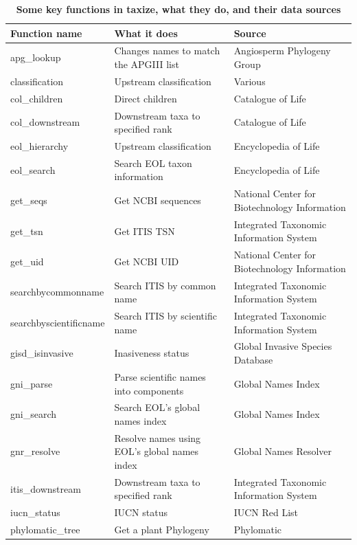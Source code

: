 \documentclass[10pt]{article}\usepackage[]{graphicx}\usepackage[]{color}
\begin{document}
\begin{table}[!ht]
\caption{
\bf{Some key functions in taxize, what they do, and their data sources}}
\begin{tabular}{|l|L|L|}
\hline
Function name & What it does & Source \\
\hline
apg\_lookup & Changes names to match the APGIII list & Angiosperm Phylogeny Group \cite{apgiii}  \\
classification & Upstream classification & Various  \\
col\_children & Direct children & Catalogue of Life \cite{col}  \\
col\_downstream & Downstream taxa to specified rank & Catalogue of Life \cite{col}  \\
eol\_hierarchy & Upstream classification & Encyclopedia of Life \cite{eol}  \\
eol\_search & Search EOL taxon information & Encyclopedia of Life \cite{eol}  \\
get\_seqs & Get NCBI sequences & National Center for Biotechnology Information \cite{federhen}  \\
get\_tsn & Get ITIS TSN & Integrated Taxonomic Information System \cite{itis}  \\
get\_uid & Get NCBI UID & National Center for Biotechnology Information \cite{federhen}  \\
searchbycommonname & Search ITIS by common name & Integrated Taxonomic Information System \cite{itis}  \\
searchbyscientificname & Search ITIS by scientific name & Integrated Taxonomic Information System \cite{itis}  \\
gisd\_isinvasive & Inasiveness status & Global Invasive Species Database \cite{gisd}  \\
gni\_parse & Parse scientific names into components & Global Names Index \cite{eol,eolgni}   \\
gni\_search & Search EOL's global names index & Global Names Index \cite{eol,eolgni}   \\
gnr\_resolve & Resolve names using EOL's global names index & Global Names Resolver \cite{eol,eolgnr}  \\
itis\_downstream & Downstream taxa to specified rank & Integrated Taxonomic Information System \cite{itis}  \\
iucn\_status & IUCN status & IUCN Red List \cite{iucn}  \\
phylomatic\_tree & Get a plant Phylogeny & Phylomatic \cite{webb2005}  \\

\end{tabular}
\end{table}
\end{document}
